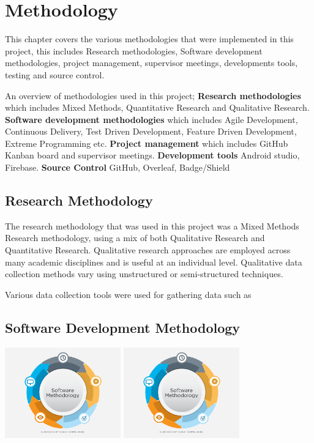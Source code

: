\chapter{Methodology}
This chapter covers the various methodologies that were implemented in this project, this includes Research methodologies, Software development methodologies, project management, supervisor meetings, developments tools, testing and source control.


An overview of methodologies used in this project; \textbf{Research methodologies} which includes Mixed Methods, Quantitative Research and Qualitative Research.
\textbf{Software development methodologies} which includes Agile Development, Continuous Delivery, Test Driven Development, Feature Driven Development, Extreme Programming etc.
\textbf{Project management} which includes GitHub Kanban board and supervisor meetings.
\textbf{Development tools} Android studio, Firebase.
\textbf{Source Control} GitHub, Overleaf, Badge/Shield

\newpage

\section{Research Methodology}
The research methodology that was used in this project was a Mixed Methods 
Research methodology, using a mix of both Qualitative Research and Quantitative 
Research. Qualitative research approaches are employed across many academic 
disciplines and is useful at an individual level. Qualitative data collection
methods vary using unstructured or semi-structured techniques.

\medskip
Various data collection tools were used for gathering data such as

\section{Software Development Methodology}
\begin{center}
    \includegraphics[width=5cm,keepaspectratio]{Images/Software_Method.png}
    \includegraphics[width=5cm,keepaspectratio]{Images/Software_Method.png}
\end{center}


